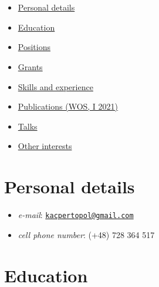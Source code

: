 \documentclass{article}
\providecommand{\tightlist}{%
  \setlength{\itemsep}{0pt}\setlength{\parskip}{0pt}}
\begin{document}
\hypertarget{section}{%
\section{}\label{section}}

\begin{itemize}
\tightlist
\item
  \protect\hyperlink{personal-details}{Personal details}
\item
  \protect\hyperlink{education}{Education}
\item
  \protect\hyperlink{positions}{Positions}
\item
  \protect\hyperlink{grants}{Grants}
\item
  \protect\hyperlink{skills-and-experience}{Skills and experience}
\item
  \href{./0pl.html}{Publications (WOS, I 2021)}
\item
  \href{./00pl.html}{Talks}
\item
  \protect\hyperlink{other-interests}{Other interests}
\end{itemize}

\hypertarget{personal-details}{%
\section{Personal details}\label{personal-details}}

\begin{itemize}
\tightlist
\item
  \emph{e-mail}:
  \href{mailto:kacpertopol@gmail.com}{\nolinkurl{kacpertopol@gmail.com}}
\item
  \emph{cell phone number}: (+48) 728 364 517
\end{itemize}

\hypertarget{education}{%
\section{Education}\label{education}}
\end{document}
